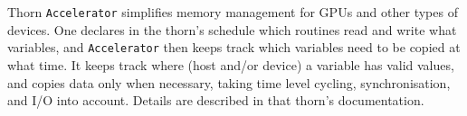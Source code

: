 Thorn \texttt{Accelerator} simplifies memory management for GPUs and
other types of devices. One declares in the thorn's schedule which
routines read and write what variables, and \texttt{Accelerator} then
keeps track which variables need to be copied at what time. It keeps
track where (host and/or device) a variable has valid values, and
copies data only when necessary, taking time level cycling,
synchronisation, and I/O into account. Details are described in that
thorn's documentation.



\begin{thebibliography}{9}

\end{thebibliography}



